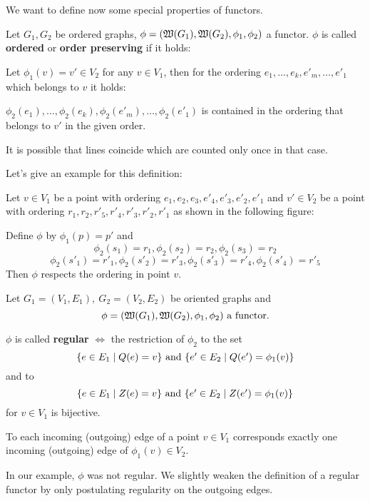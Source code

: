 \bigskip
We want to define now some special properties of functors.

\begin{definition}
Let $G_1, G_2$ be ordered graphs, $\phi = (\mbox{$\mathfrak{W}(G_1)$}, \mbox{$\mathfrak{W}(G_2)$},
\phi_1, \phi_2)$ a functor. $\phi$ is called {\bf ordered} or {\bf order
preserving} if it holds:

Let $\phi_1(v) = v' \in V_2$ for any $v \in V_1$, then for the ordering $e_1,
\ldots, e_k, e'_m, \ldots, e'_1$ which belongs to $v$ it holds:

$\phi_2(e_1), \ldots, \phi_2(e_k), \phi_2(e'_m), \ldots, \phi_2(e'_1)$ is
contained in the ordering that belongs to $v'$ in the given order. 
\end{definition}

It is possible that lines coincide which are counted only once in that case.

Let's give an example for this definition:

Let $v \in V_1$ be a point with ordering $e_1, e_2, e_3, e'_4, e'_3, e'_2,
e'_1$ and $v' \in V_2$ be a point with ordering $r_1, r_2, r'_5,
r'_4, r'_3, r'_2, r'_1$ as shown in the following figure:

\begin{center}

\end{center}

Define $\phi$ by $\phi_1(p) = p'$ and 
\[ \phi_2(s_1) = r_1, \phi_2(s_2) = r_2, \phi_2(s_3) = r_2 \]
\[ \phi_2(s'_1) = r'_1, \phi_2(s'_2) = r'_3, \phi_2(s'_3) = r'_4, \phi_2(s'_4) =
r'_5 \]
Then $\phi$ respects the ordering in point $v$.

\bigskip
\begin{definition}
Let $G_1=(V_1,E_1),\ G_2=(V_2,E_2)$ be oriented graphs and 
\[ \phi = (\mbox{$\mathfrak{W}(G_1)$}, \mbox{$\mathfrak{W}(G_2)$}, \phi_1, \phi_2)\text{ a functor.}
\]

$\phi$ is called {\bf regular} $\iff$ the restriction of $\phi_2$
to the set \[ \mbox{$\{e \in E_1 \mid Q(e) = v\}$}\text{ and }\mbox{$\{e' \in E_2 \mid
Q(e') = \phi_1(v)\}$} \] and to \[ \mbox{$\{e \in E_1 \mid Z(e) = v\}$}\text{ and
}\mbox{$\{e' \in E_2 \mid Z(e') = \phi_1(v)\}$} \] for $v \in V_1$ is bijective.
\end{definition}

To each incoming (outgoing) edge of a point $v \in V_1$ corresponds exactly
one incoming (outgoing) edge of $\phi_1(v) \in V_2$.

In our example, $\phi$ was not regular. We slightly weaken the definition of a
regular functor by only postulating regularity on the outgoing edges.

